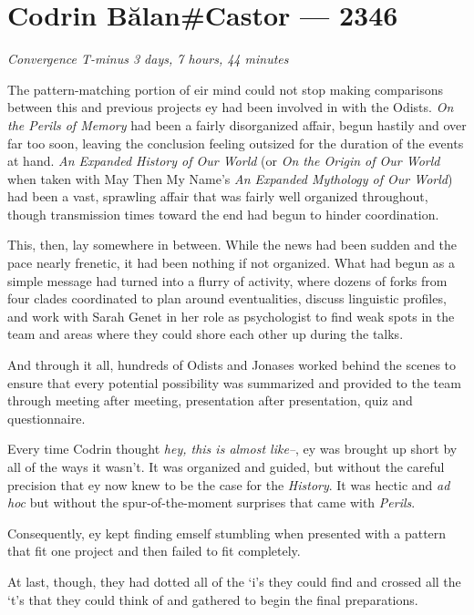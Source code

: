 \hypertarget{codrin-bux103lancastor-2346}{%
\chapter{Codrin Bălan\#Castor — 2346}}

\begin{center}
\emph{Convergence T-minus 3 days, 7 hours, 44 minutes}
\end{center}

\noindent The pattern-matching portion of eir mind could not stop making comparisons between this and previous projects ey had been involved in with the Odists. \emph{On the Perils of Memory} had been a fairly disorganized affair, begun hastily and over far too soon, leaving the conclusion feeling outsized for the duration of the events at hand. \emph{An Expanded History of Our World} (or \emph{On the Origin of Our World} when taken with May Then My Name's \emph{An Expanded Mythology of Our World}) had been a vast, sprawling affair that was fairly well organized throughout, though transmission times toward the end had begun to hinder coordination.

This, then, lay somewhere in between. While the news had been sudden and the pace nearly frenetic, it had been nothing if not organized. What had begun as a simple message had turned into a flurry of activity, where dozens of forks from four clades coordinated to plan around eventualities, discuss linguistic profiles, and work with Sarah Genet in her role as psychologist to find weak spots in the team and areas where they could shore each other up during the talks.

And through it all, hundreds of Odists and Jonases worked behind the scenes to ensure that every potential possibility was summarized and provided to the team through meeting after meeting, presentation after presentation, quiz and questionnaire.

Every time Codrin thought \emph{hey, this is almost like--}, ey was brought up short by all of the ways it wasn't. It was organized and guided, but without the careful precision that ey now knew to be the case for the \emph{History}. It was hectic and \emph{ad hoc} but without the spur-of-the-moment surprises that came with \emph{Perils}.

Consequently, ey kept finding emself stumbling when presented with a pattern that fit one project and then failed to fit completely.

At last, though, they had dotted all of the `i's they could find and crossed all the `t's that they could think of and gathered to begin the final preparations.

